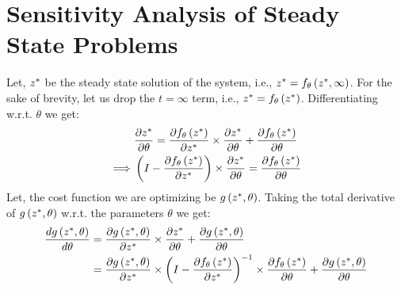 
\section{Sensitivity Analysis of Steady State Problems}
\label{sec:sensitivity_analysis_ssproblems}

Let, $z^*$ be the steady state solution of the system, i.e., $z^* = f_\theta\left(z^*, \infty\right)$. For the sake of brevity, let us drop the $t = \infty$ term, i.e., $z^* = f_\theta\left(z^*\right)$. Differentiating w.r.t. $\theta$ we get:
%
\begin{align}
           & \frac{\partial z^*}{\partial \theta} = \frac{\partial f_\theta\left(z^*\right)}{\partial z^*} \times \frac{\partial z^*}{\partial \theta} + \frac{\partial f_\theta\left(z^*\right)}{\partial \theta} \\
  \implies & \left( I - \frac{\partial f_\theta\left(z^*\right)}{\partial z^*} \right) \times \frac{\partial z^*}{\partial \theta} = \frac{\partial f_\theta\left(z^*\right)}{\partial \theta}
\end{align}
%
Let, the cost function we are optimizing be $g\left(z^*, \theta\right)$. Taking the total derivative of $g\left(z^*, \theta\right)$ w.r.t. the parameters $\theta$ we get:
%
\begin{align}
  \frac{d g\left(z^*, \theta\right)}{d \theta} & = \frac{\partial g\left(z^*, \theta\right)}{\partial z^*} \times \frac{\partial z^*}{\partial \theta} + \frac{\partial g\left(z^*, \theta\right)}{\partial \theta}                                                                                                                                 \\
                                              & = \frac{\partial g\left(z^*, \theta\right)}{\partial z^*} \times \left( I - \frac{\partial f_\theta\left(z^*\right)}{\partial z^*} \right)^{-1} \times \frac{\partial f_\theta\left(z^*\right)}{\partial \theta} + \frac{\partial g\left(z^*, \theta\right)}{\partial \theta} \label{eq:ss_gradient}
\end{align}
%
